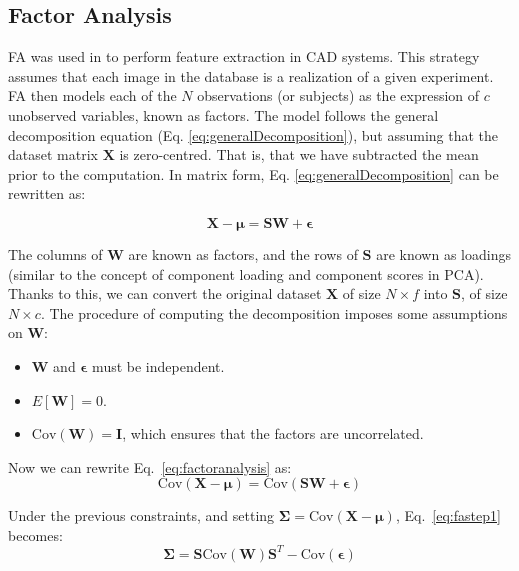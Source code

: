 \subsection{Factor Analysis}
\acf{FA} was used in \cite{Martinez201141,Martinez-Murcia20129676} to perform feature extraction in \ac{CAD} systems. This strategy assumes that each image in the database is a realization of a given experiment. \ac{FA} then models each of the $N$ observations (or subjects) as the expression of $c$ unobserved variables, known as factors. The model follows the general decomposition equation (Eq. \ref{eq:generalDecomposition}), but assuming that the dataset matrix $\mathbf{X}$ is zero-centred. That is, that we have subtracted the mean prior to the computation. In matrix form, Eq. \ref{eq:generalDecomposition} can be rewritten as:

\begin{equation}\label{eq:factoranalysis}
\mathbf{X} -\boldsymbol{\mu}= \mathbf{S}\mathbf{W} +  \boldsymbol{\epsilon}
\end{equation}

The columns of $\mathbf{W}$ are known as factors, and the rows of $\mathbf{S}$ are known as loadings  (similar to the concept of component loading and component scores in \ac{PCA}). Thanks to this, we can convert the original dataset $\mathbf{X}$ of size $N\times f$ into $\mathbf{S}$, of size $N\times c$. The procedure of computing the decomposition imposes some assumptions on $\mathbf{W}$: 
\begin{itemize}
	\item $\mathbf{W}$ and $\boldsymbol{\epsilon}$ must be independent. 
	\item $E[\mathbf{W}] = 0$. 
	\item $\text{Cov}(\mathbf{W}) = \mathbf{I}$, which ensures that the factors are uncorrelated. 
\end{itemize}

Now we can rewrite Eq.~\ref{eq:factoranalysis} as:
\begin{equation}\label{eq:fastep1}
\text{Cov}(\mathbf{X} -\boldsymbol{\mu})= \text{Cov}(\mathbf{S}\mathbf{W} +  \boldsymbol{\epsilon})
\end{equation} 

Under the previous constraints, and setting $\boldsymbol{\Sigma} = \text{Cov}(\mathbf{X} -\boldsymbol{\mu})$, Eq.~\ref{eq:fastep1} becomes:
\begin{equation}
\boldsymbol{\Sigma} = \mathbf{S}\text{Cov}(\mathbf{W})\mathbf{S}^T - \text{Cov}(\boldsymbol{\epsilon})
\end{equation}

